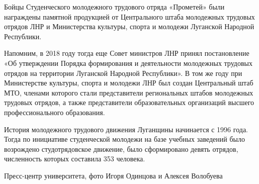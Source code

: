 Бойцы Студенческого молодежного трудового отряда «Прометей» были награждены
памятной продукцией от Центрального штаба молодежных трудовых отрядов ЛНР и
Министерства культуры, спорта и молодежи Луганской Народной Республики.


Напомним, в 2018 году тогда еще Совет министров ЛНР принял постановление «Об
утверждении Порядка формирования и деятельности молодежных трудовых отрядов на
территории Луганской Народной Республики». В том же году при Министерстве
культуры, спорта и молодежи ЛНР был создан Центральный штаб МТО, членами
которого стали представители региональных штабов молодежных трудовых отрядов, а
также представители образовательных организаций высшего профессионального
образования.

История молодежного трудового движения Луганщины начинается с 1996 года. Тогда
по инициативе студенческой молодежи на базе учебных заведений было возрождено
студотрядовское движение, было сформировано девять отрядов, численность которых
составила 353 человека.


Пресс-центр университета, фото Игоря Одинцова и Алексея Волобуева
